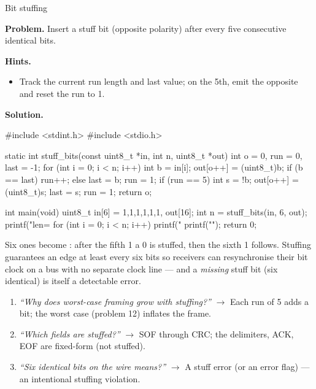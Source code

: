 \begin{gymproblem}{Bit stuffing}

\textbf{Problem.} Insert a stuff bit (opposite polarity) after every five
consecutive identical bits.

\textbf{Hints.}
\begin{itemize}
\item Track the current run length and last value; on the 5th, emit the
  opposite and reset the run to 1.
\end{itemize}

\attempt

\textbf{Solution.}
\begin{cgym}
#include <stdint.h>
#include <stdio.h>

static int stuff_bits(const uint8_t *in, int n, uint8_t *out) {
    int o = 0, run = 0, last = -1;
    for (int i = 0; i < n; i++) {
        int b = in[i];
        out[o++] = (uint8_t)b;
        if (b == last) run++; else { last = b; run = 1; }
        if (run == 5) { int s = !b; out[o++] = (uint8_t)s; last = s; run = 1; }
    }
    return o;
}

int main(void) {
    uint8_t in[6] = {1,1,1,1,1,1}, out[16];
    int n = stuff_bits(in, 6, out);
    printf("len=%
    for (int i = 0; i < n; i++) printf("%
    printf("\n");
    return 0;
}
\end{cgym}

Six ones become : after the fifth 1 a 0 is stuffed, then the sixth
1 follows. Stuffing guarantees an edge at least every six bits so receivers can
resynchronise their bit clock on a bus with no separate clock line --- and a
\emph{missing} stuff bit (six identical) is itself a detectable error.

\followups
\begin{enumerate}
\item \emph{``Why does worst-case framing grow with stuffing?''} $\rightarrow$
  Each run of 5 adds a bit; the worst case (problem 12) inflates the frame.
\item \emph{``Which fields are stuffed?''} $\rightarrow$ SOF through CRC; the
  delimiters, ACK, EOF are fixed-form (not stuffed).
\item \emph{``Six identical bits on the wire means?''} $\rightarrow$ A stuff
  error (or an error flag) --- an intentional stuffing violation.
\end{enumerate}
\end{gymproblem}

